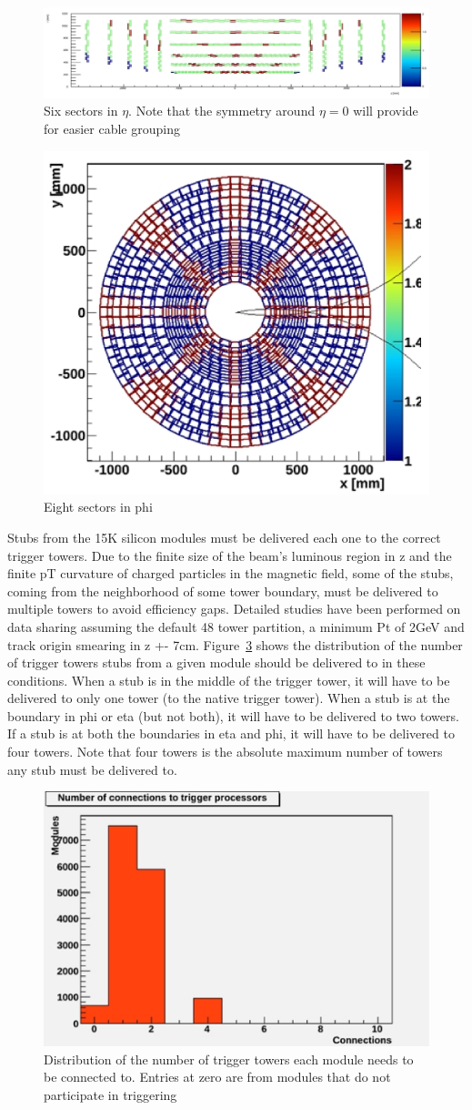 \begin{figure}[ht!]
\centering
\includegraphics[width=0.8\columnwidth]{Plots/SecDef_RZ.eps}
\caption{Six sectors in $\eta$. Note that the symmetry around $\eta=0$ will provide for easier cable grouping}
\label{fig:SecDef_RZ}
\end{figure}
\begin{figure}[ht!]
\centering
\includegraphics[width=0.45\columnwidth]{Plots/SecDef_XY.eps}
\caption{Eight sectors in phi}
\label{fig:SecDef_XY}
\end{figure}

\noindent Stubs from the 15K silicon modules must be delivered each one to the correct trigger towers. Due to the finite size of the beam's luminous region in z and the finite pT curvature of charged particles in the magnetic field, some of the stubs, coming from the neighborhood of some tower boundary, must be delivered to multiple towers to avoid efficiency gaps.  Detailed studies have been performed on data sharing assuming the default 48 tower partition, a minimum Pt of 2GeV and track origin smearing in z +- 7cm. Figure~\ref{fig:SecDef_N} shows the distribution of the number of trigger towers stubs from a given module should be delivered to in these conditions. When a stub is in the middle of the trigger tower, it will have to be delivered to only one tower (to the native trigger tower). When a stub is at the boundary in phi or eta (but not both), it will have to be delivered to two towers. If a stub is at both the boundaries in eta and phi, it will have to be delivered to four towers. Note that four towers is the absolute maximum number of towers any stub must be delivered to. 

\begin{figure}[ht!]
\centering
\includegraphics[width=0.45\columnwidth]{Plots/SecDef_N.eps}
\caption{Distribution of the number of trigger towers each module needs to be connected to. Entries at zero are from modules that do not participate in triggering}
\label{fig:SecDef_N}
\end{figure}

